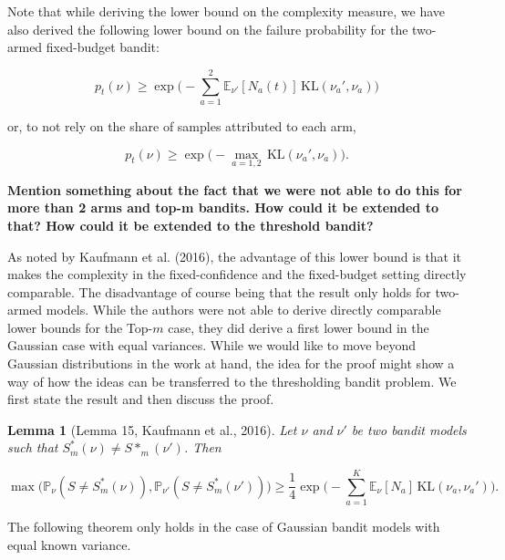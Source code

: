 \documentclass[12pt,]{article}
\newtheorem{lemma}{Lemma}
\newcommand{\KL}{\,\text{KL}}
\begin{document}
Note that while deriving the lower bound on the complexity measure, we
have also derived the following lower bound on the failure probability
for the two-armed fixed-budget bandit:

\begin{equation*}
p_t(\nu) \geq \exp \big(- \sum_{a=1}^2 \mathbb{E}_{\nu'}[N_a(t)] \KL(\nu_a', \nu_a) \big)
\end{equation*}

or, to not rely on the share of samples attributed to each arm,

\begin{equation*}
p_t(\nu) \geq \exp \big(- \max_{a=1,2} \KL(\nu_a', \nu_a) \big).
\end{equation*}

\textbf{Mention something about the fact that we were not able to do
this for more than 2 arms and top-m bandits. How could it be extended to
that? How could it be extended to the threshold bandit?}

As noted by Kaufmann et al. (2016), the advantage of this lower bound is
that it makes the complexity in the fixed-confidence and the
fixed-budget setting directly comparable. The disadvantage of course
being that the result only holds for two-armed models. While the authors
were not able to derive directly comparable lower bounds for the
Top-\(m\) case, they did derive a first lower bound in the Gaussian case
with equal variances. While we would like to move beyond Gaussian
distributions in the work at hand, the idea for the proof might show a
way of how the ideas can be transferred to the thresholding bandit
problem. We first state the result and then discuss the proof.

\begin{lemma}[Lemma 15, Kaufmann et al., 2016] \label{theorem:KaufmannEtAlLemma15}
Let $\nu$ and $\nu'$ be two bandit models such that $S^*_m(\nu) \neq S*_m(\nu')$. Then

\begin{equation*}
\max \big( \mathbb{P}_{\nu}(S \neq S^*_m(\nu)), \mathbb{P}_{\nu'}(S \neq S^*_m(\nu')) \big) \geq \frac{1}{4} \exp \Big(-\sum_{a=1}^{K} \mathbb{E}_{\nu}[N_a] \KL(\nu_a, \nu_a') \Big).
\end{equation*}
\end{lemma}

The following theorem only holds in the case of Gaussian bandit models
with equal known variance.
\end{document}
